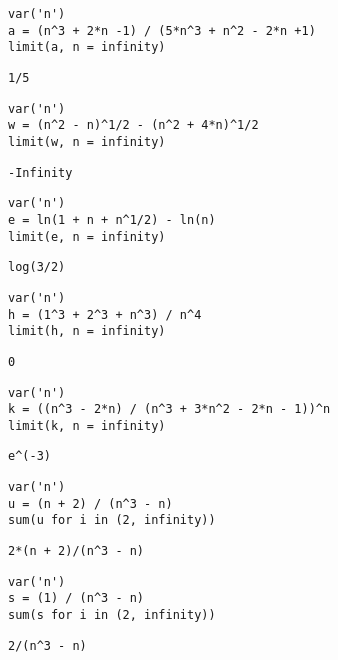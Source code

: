 \documentclass[
]{article}
\author{}
\date{}
\begin{document}
\begin{verbatim}
var('n')
a = (n^3 + 2*n -1) / (5*n^3 + n^2 - 2*n +1)
limit(a, n = infinity)
\end{verbatim}

\begin{verbatim}
1/5
\end{verbatim}

\begin{verbatim}
var('n')
w = (n^2 - n)^1/2 - (n^2 + 4*n)^1/2
limit(w, n = infinity)
\end{verbatim}

\begin{verbatim}
-Infinity
\end{verbatim}

\begin{verbatim}
var('n')
e = ln(1 + n + n^1/2) - ln(n)
limit(e, n = infinity)
\end{verbatim}

\begin{verbatim}
log(3/2)
\end{verbatim}

\begin{verbatim}
var('n')
h = (1^3 + 2^3 + n^3) / n^4
limit(h, n = infinity)
\end{verbatim}

\begin{verbatim}
0
\end{verbatim}

\begin{verbatim}
var('n')
k = ((n^3 - 2*n) / (n^3 + 3*n^2 - 2*n - 1))^n
limit(k, n = infinity)
\end{verbatim}

\begin{verbatim}
e^(-3)
\end{verbatim}

\begin{verbatim}
var('n')
u = (n + 2) / (n^3 - n)
sum(u for i in (2, infinity))
\end{verbatim}

\begin{verbatim}
2*(n + 2)/(n^3 - n)
\end{verbatim}

\begin{verbatim}
var('n')
s = (1) / (n^3 - n)
sum(s for i in (2, infinity))
\end{verbatim}

\begin{verbatim}
2/(n^3 - n)
\end{verbatim}
\end{document}
